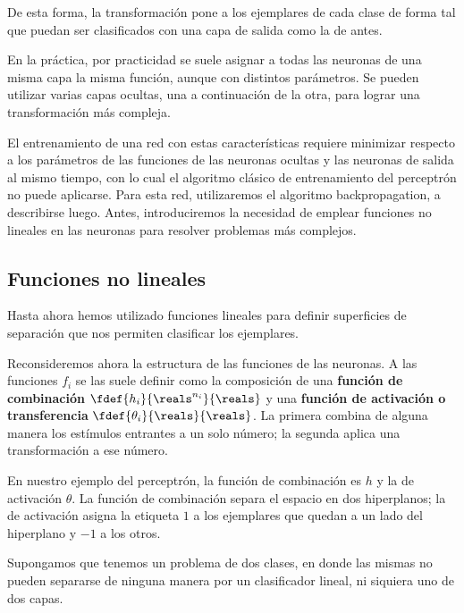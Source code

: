 
De esta forma, la transformación pone a los ejemplares de cada clase de forma tal que puedan ser clasificados con una capa de salida como la de antes.

En la práctica, por practicidad se suele asignar a todas las neuronas de una misma capa la misma función, aunque con distintos parámetros. Se pueden utilizar varias capas ocultas, una a continuación de la otra, para lograr una transformación más compleja. 

El entrenamiento de una red con estas características requiere minimizar respecto a los parámetros de las funciones de las neuronas ocultas y las neuronas de salida al mismo tiempo, con lo cual el algoritmo clásico de entrenamiento del perceptrón no puede aplicarse. Para esta red, utilizaremos el algoritmo backpropagation, a describirse luego. Antes, introduciremos la necesidad de emplear funciones no lineales en las neuronas para resolver problemas más complejos.

\subsection{Funciones no lineales}

Hasta ahora hemos utilizado funciones lineales para definir superficies de separación que nos permiten clasificar los ejemplares. 

Reconsideremos ahora la estructura de las funciones de las neuronas. A las funciones $f_i$ se las suele definir como la composición de una \textbf{función de combinación} $\fdef{h_i}{\reals^{n_i}}{\reals}$ y una \textbf{función de activación o transferencia} $\fdef{\theta_i}{\reals}{\reals}$. La primera combina de alguna manera los estímulos entrantes a un solo número; la segunda aplica una transformación a ese número. 

En nuestro ejemplo del perceptrón, la función de combinación es $h$ y la de activación $\theta$. La función de combinación separa el espacio en dos hiperplanos; la de activación asigna la etiqueta $1$ a los ejemplares que quedan a un lado del hiperplano y $-1$ a los otros. 

Supongamos que tenemos un problema de dos clases, en donde las mismas no pueden separarse de ninguna manera por un clasificador lineal, ni siquiera uno de dos capas. 

